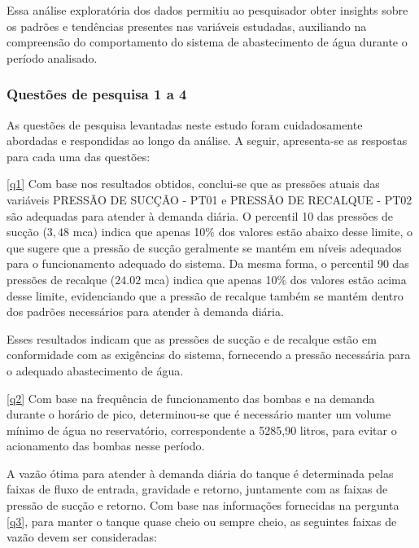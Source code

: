 Essa análise exploratória dos dados permitiu ao pesquisador obter insights sobre os padrões e tendências presentes nas variáveis estudadas, auxiliando na compreensão do comportamento do sistema de abastecimento de água durante o período analisado.



\subsubsection{Quest\~oes de pesquisa 1 a 4}\label{subsubsec:quest-est}

As questões de pesquisa levantadas neste estudo foram cuidadosamente abordadas e respondidas ao longo da análise. A seguir, apresenta-se as respostas para cada uma das questões:

\ref{q1} Com base nos resultados obtidos, conclui-se que as pressões atuais das variáveis PRESSÃO DE SUCÇÃO - PT01 e PRESSÃO DE RECALQUE - PT02 são adequadas para atender à demanda diária. O percentil 10 das pressões de sucção ($3,48$ mca) indica que apenas 10\% dos valores estão abaixo desse limite, o que sugere que a pressão de sucção geralmente se mantém em níveis adequados para o funcionamento adequado do sistema. Da mesma forma, o percentil 90 das pressões de recalque ($24.02$ mca) indica que apenas 10\% dos valores estão acima desse limite, evidenciando que a pressão de recalque também se mantém dentro dos padrões necessários para atender à demanda diária.

Esses resultados indicam que as pressões de sucção e de recalque estão em conformidade com as exigências do sistema, fornecendo a pressão necessária para o adequado abastecimento de água.

\ref{q2} Com base na frequência de funcionamento das bombas e na demanda durante o horário de pico, determinou-se que é necessário manter um volume mínimo de água no reservatório, correspondente a 5285,90 litros, para evitar o acionamento das bombas nesse período.

A vazão ótima para atender à demanda diária do tanque é determinada pelas faixas de fluxo de entrada, gravidade e retorno, juntamente com as faixas de pressão de sucção e retorno. Com base nas informações fornecidas na pergunta \ref{q3}, para manter o tanque quase cheio ou sempre cheio, as seguintes faixas de vazão devem ser consideradas:

